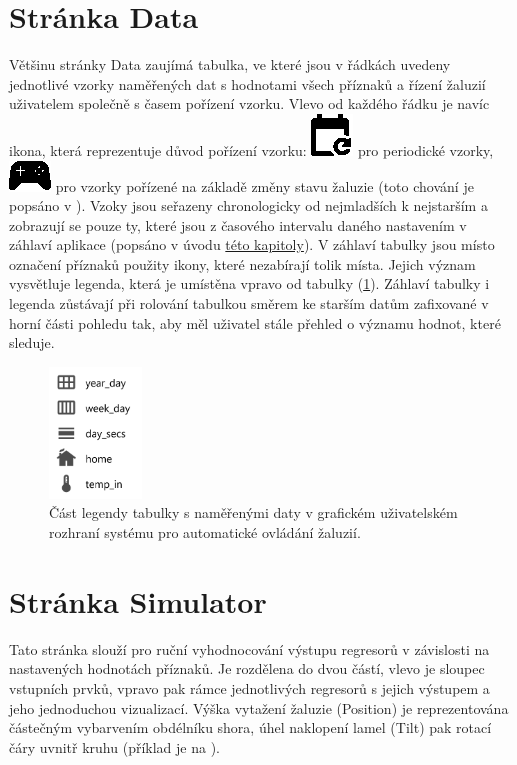 \section{Stránka Data} \label{sec:data}
    Většinu stránky Data zaujímá tabulka, ve které jsou v řádkách uvedeny jednotlivé vzorky naměřených dat s hodnotami všech příznaků a řízení žaluzií uživatelem společně s časem pořízení vzorku. Vlevo od každého řádku je navíc ikona, která reprezentuje důvod pořízení vzorku: \includegraphics[height=0.85\baselineskip]{img/periodic.eps} pro periodické vzorky, \includegraphics[height=0.85\baselineskip]{img/event.eps} pro vzorky pořízené na základě změny stavu žaluzie (toto chování je popsáno v ). Vzoky jsou seřazeny chronologicky od nejmladších k nejstarším a zobrazují se pouze ty, které jsou z časového intervalu daného nastavením v záhlaví aplikace (popsáno v úvodu \hyperref[chap:gui]{této kapitoly}). V záhlaví tabulky jsou místo označení příznaků použity ikony, které nezabírají tolik místa. Jejich význam vysvětluje legenda, která je umístěna vpravo od tabulky (\cref{fig:legenda}). Záhlaví tabulky i legenda zůstávají při rolování tabulkou směrem ke starším datům zafixované v horní části pohledu tak, aby měl uživatel stále přehled o významu hodnot, které sleduje.
    \begin{figure}
        \centering
        \includegraphics[draft=\draftfig,width=0.22\textwidth]{img/gui/legenda.png}
        \caption[Legenda tabulky s daty]{Část legendy tabulky s naměřenými daty v grafickém uživatelském rozhraní systému pro automatické ovládání žaluzií.}
        \label{fig:legenda}
    \end{figure}
\section{Stránka Simulator} \label{sec:sim}
    Tato stránka slouží pro ruční vyhodnocování výstupu regresorů v závislosti na nastavených hodnotách příznaků. Je rozdělena do dvou částí, vlevo je sloupec vstupních prvků, vpravo pak rámce jednotlivých regresorů s jejich výstupem a jeho jednoduchou vizualizací. Výška vytažení žaluzie (Position) je reprezentována částečným vybarvením obdélníku shora, úhel naklopení lamel (Tilt) pak rotací čáry uvnitř kruhu (příklad je na ).
    
